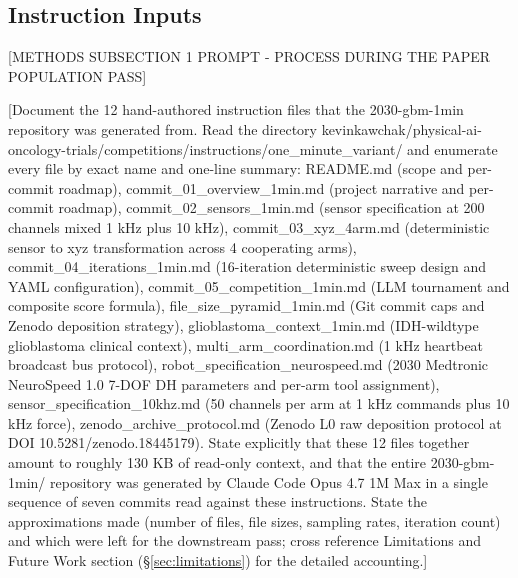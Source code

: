 
\subsection{Instruction Inputs}
\label{sec:methods-inputs}

[METHODS SUBSECTION 1 PROMPT - PROCESS DURING THE PAPER POPULATION PASS]

[Document the 12 hand-authored instruction files that the
2030-gbm-1min repository was generated from. Read the directory
kevinkawchak/physical-ai-oncology-trials/competitions/instructions/one_minute_variant/
and enumerate every file by exact name and one-line summary: README.md
(scope and per-commit roadmap), commit_01_overview_1min.md (project
narrative and per-commit roadmap), commit_02_sensors_1min.md (sensor
specification at 200 channels mixed 1 kHz plus 10 kHz), commit_03_xyz_4arm.md
(deterministic sensor to xyz transformation across 4 cooperating arms),
commit_04_iterations_1min.md (16-iteration deterministic sweep design
and YAML configuration), commit_05_competition_1min.md (LLM tournament
and composite score formula), file_size_pyramid_1min.md (Git commit
caps and Zenodo deposition strategy), glioblastoma_context_1min.md
(IDH-wildtype glioblastoma clinical context), multi_arm_coordination.md
(1 kHz heartbeat broadcast bus protocol), robot_specification_neurospeed.md
(2030 Medtronic NeuroSpeed 1.0 7-DOF DH parameters and per-arm tool
assignment), sensor_specification_10khz.md (50 channels per arm at
1 kHz commands plus 10 kHz force), zenodo_archive_protocol.md
(Zenodo L0 raw deposition protocol at DOI 10.5281/zenodo.18445179).
State explicitly that these 12 files together amount to roughly 130 KB
of read-only context, and that the entire 2030-gbm-1min/ repository
was generated by Claude Code Opus 4.7 1M Max in a single sequence of
seven commits read against these instructions. State the
approximations made (number of files, file sizes, sampling rates,
iteration count) and which were left for the downstream pass; cross
reference Limitations and Future Work section
(\S\ref{sec:limitations}) for the detailed accounting.]

